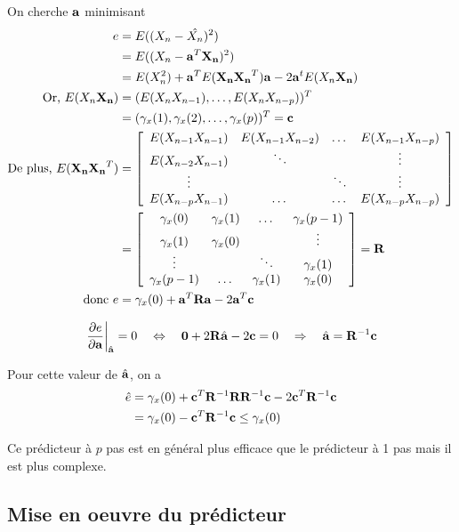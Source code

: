 \documentclass[main.tex]{subfiles}
\begin{document}
On cherche $\ap$ minimisant
\begin{align*}
e & = E((X_n-\hat{X_n})^2) \\
& = E((X_n-\ap^T\Xn)^2) \\
& = E(X_n^2) + \ap^T E(\Xn\Xn^T) \ap -2\ap^t E(X_n\Xn) \\
\text{Or, } E(X_n\Xn)& =(E(X_nX_{n-1}),\dots,E(X_nX_{n-p}))^T \\
& = (\gamma_x(1), \gamma_x(2),\dots,\gamma_x(p))^T = \cp \\
\text{De plus, } E(\Xn\Xn^T) & =
\left[
\begin{array}{cccc}
E(X_{n-1}X_{n-1}) &E(X_{n-1}X_{n-2}) & \dots & E(X_{n-1}X_{n-p}) \\
E(X_{n-2}X_{n-1}) & \ddots & & \vdots \\
\vdots & & \ddots & \vdots \\
E(X_{n-p}X_{n-1}) & \dots & \dots & E(X_{n-p}X_{n-p})
\end{array}
\right] \\
& =
\left[
\begin{array}{cccc}
\gamma_x(0) & \gamma_x(1) & \dots & \gamma_x(p-1) \\
\gamma_x(1) & \gamma_x(0) & & \vdots \\
\vdots & & \ddots & \gamma_x(1) \\
\gamma_x(p-1) & \dots & \gamma_x(1) & \gamma_x(0)
\end{array}
\right] = \Rp\\
\text{ donc } e & = \gamma_x(0) + \ap^T \Rp \ap - 2 \ap^T \cp
\end{align*}

\[ \left.\derivp[e]{\ap}\right|_{\hat{\ap}} =  0  \quad \Leftrightarrow \quad \vec{0} + 2 \Rp\hat{\ap} - 2\cp = 0  \quad \Rightarrow \quad \hat{\ap} = \Rp^{-1} \cp \]

Pour cette valeur de $\hat{\ap}$, on a
\begin{align*}
\hat{e} & = \gamma_x(0) + \cp^T \Rp^{-1} \Rp \Rp^{-1} \cp -2\cp^T\Rp^{-1}\cp \\
& = \gamma_x(0) - \cp^T \Rp^{-1} \cp \leq \gamma_x(0)
\end{align*}

Ce prédicteur à $p$ pas est en général plus efficace que le prédicteur à 1 pas mais il est plus complexe.

\subsection{Mise en oeuvre du prédicteur}
\end{document}
